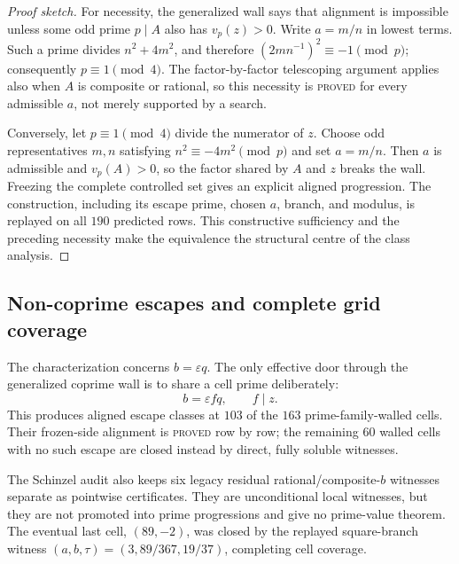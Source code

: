 \begin{proof}[Proof sketch]
For necessity, the generalized wall says that alignment is impossible unless
some odd prime $p\mid A$ also has $v_p(z)>0$.  Write $a=m/n$ in lowest terms.
Such a prime divides $n^2+4m^2$, and therefore
$(2m n^{-1})^2\equiv-1\pmod p$; consequently $p\equiv1\pmod4$.  The
factor-by-factor telescoping argument applies also when $A$ is composite or
rational, so this necessity is \textsc{proved} for every admissible $a$, not
merely supported by a search.

Conversely, let $p\equiv1\pmod4$ divide the numerator of $z$.  Choose odd
representatives $m,n$ satisfying
$n^2\equiv-4m^2\pmod p$ and set $a=m/n$.  Then $a$ is admissible and
$v_p(A)>0$, so the factor shared by $A$ and $z$ breaks the wall.  Freezing the
complete controlled set gives an explicit aligned progression.  The
construction, including its escape prime, chosen $a$, branch, and modulus,
is replayed on all $190$ predicted rows.  This constructive sufficiency and
the preceding necessity make the equivalence the structural centre of the
class analysis.
\end{proof}

\subsection{Non-coprime escapes and complete grid coverage}

The characterization concerns $b=\varepsilon q$.  The only effective door
through the generalized coprime wall is to share a cell prime deliberately:
\[
 b=\varepsilon f q,\qquad f\mid z.
\]
This produces aligned escape classes at $103$ of the $163$ prime-family-walled
cells.  Their frozen-side alignment is \textsc{proved} row by row; the
remaining $60$ walled cells with no such escape are closed instead by direct,
fully soluble witnesses.

The Schinzel audit also keeps six legacy residual rational/composite-$b$
witnesses separate as pointwise certificates.  They are unconditional local
witnesses, but they are not promoted into prime progressions and give no
prime-value theorem.  The eventual last cell, $(89,-2)$, was closed by the
replayed square-branch witness
$(a,b,\tau)=(3,89/367,19/37)$, completing cell coverage.

